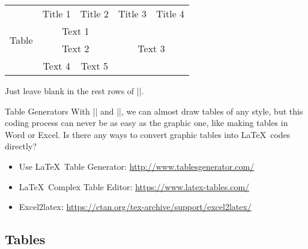 \begin{frame}[fragile]

\begin{latexexample}
\centering
\begin{tabular}{ccccc}
  \toprule
  \multirow{4}{*}{Table} & Title 1 & Title 2 & Title 3 & Title 4 \\
  \cmidrule{2-5}
  & \multicolumn{2}{c}{Text 1} & 
  \multicolumn{2}{c}{\multirow{3}{*}{Text 3}} \\
  \cmidrule{2-3}
  & \multicolumn{2}{c}{Text 2} & \multicolumn{2}{c}{} \\
  \cmidrule{2-3}
  & Text 4 & Text 5 & \multicolumn{2}{c}{} \\
  \bottomrule
\end{tabular}
\end{latexexample}

Just leave blank in the rest rows of \LC|\multirow|.

\end{frame}


\begin{frame}[fragile]{Table Generators}
	With \LC|\multirow| and \LC|\multicolumn|, we can almost draw tables of any style, but this coding process can never be as easy as the graphic one, like making tables in Word or Excel. Is there any ways to convert graphic tables into \LaTeX\ codes directly?\\
	\begin{itemize}
		\item Use \LaTeX\ Table Generator: \url{http://www.tablesgenerator.com/}
		\item \LaTeX\ Complex Table Editor: \url{https://www.latex-tables.com/}
		\item Excel2latex: \url{https://ctan.org/tex-archive/support/excel2latex/}
	\end{itemize}
\end{frame}

\subsection{Tables}

